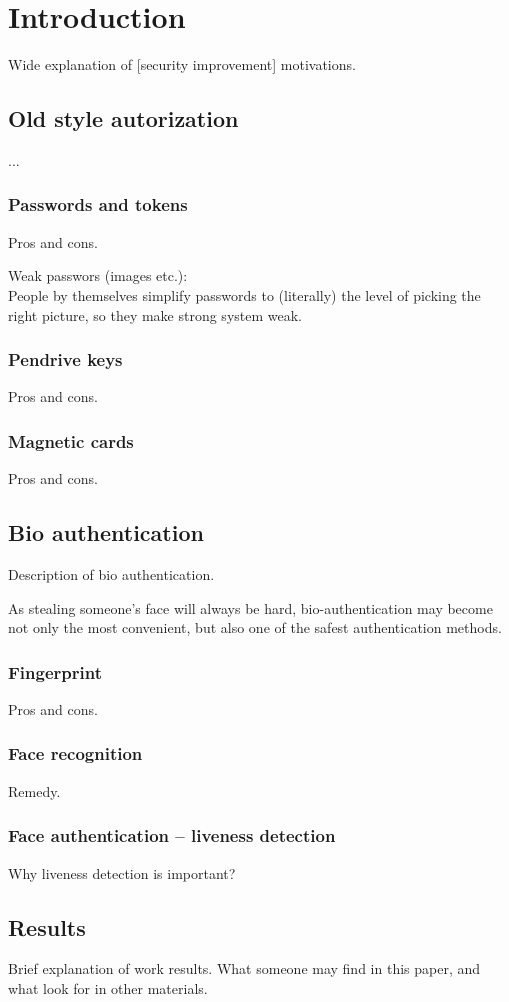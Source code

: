 \section{Introduction}
    Wide explanation of [security improvement] motivations.

    \subsection*{Old style autorization}
        ...

        \subsubsection*{Passwords and tokens}
            Pros and cons.

            Weak passwors (images etc.):\\
            People by themselves simplify passwords to
            (literally) the level of picking the right picture,
            so they make strong system weak.

        \subsubsection*{Pendrive keys}
            Pros and cons.

        \subsubsection*{Magnetic cards}
            Pros and cons.

    \subsection{Bio authentication}
        Description of bio authentication.

        As stealing someone's face will always be hard,
        bio-authentication may become not only the most
        convenient, but also one of the safest
        authentication methods.

        \subsubsection*{Fingerprint}
            Pros and cons.

        \subsubsection*{Face recognition}
            Remedy.

        \subsubsection{Face authentication -- liveness detection}
            Why liveness detection is important?

    \subsection{Results}
        Brief explanation of work results.
        What someone may find in this paper,
        and what look for in other materials.
